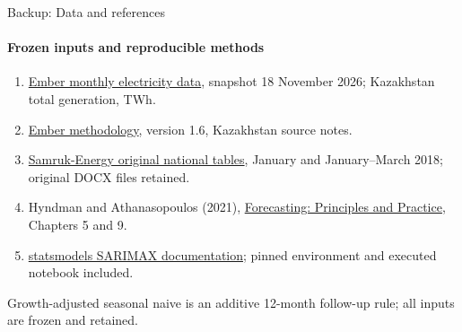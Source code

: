 \documentclass[aspectratio=169,10pt]{beamer}
\newcommand{\Source}[1]{\par\vfill{\fontsize{6.5}{7.5}\selectfont\color{black!65}#1\par}}
\begin{document}
\begin{frame}[t]{Backup: Data and references}
\framesubtitle{Frozen inputs and reproducible methods}
\small
\begin{enumerate}
\item \href{https://ember-energy.org/data/monthly-electricity-data/}{Ember monthly electricity data}, snapshot 18 November 2026; Kazakhstan total generation, TWh.
\item \href{https://files.ember-energy.org/public-downloads/ember_electricity_data_methodology.pdf}{Ember methodology}, version 1.6, Kazakhstan source notes.
\item \href{https://samruk-energy.kz/en/press-center/analytical-review}{Samruk-Energy original national tables}, January and January--March 2018; original DOCX files retained.
\item Hyndman and Athanasopoulos (2021), \href{https://otexts.com/fpp3/}{Forecasting: Principles and Practice}, Chapters 5 and 9.
\item \href{https://www.statsmodels.org/stable/generated/statsmodels.tsa.statespace.sarimax.SARIMAX.html}{statsmodels SARIMAX documentation}; pinned environment and executed notebook included.
\end{enumerate}
\Source{Growth-adjusted seasonal naive is an additive 12-month follow-up rule; all inputs are frozen and retained.}
\end{frame}
\end{document}
